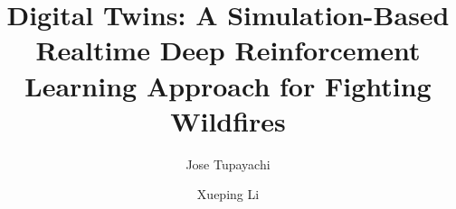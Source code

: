 \documentclass{scspaperproc}
\theoremstyle{scsthe}
\begin{document}
%
%

\def\SCSconferencename{Annual Simulation Conference}

\def\SCSconferenceacro{ANNSIM'24}

\def\SCSpublicationyear{2024}

\def\SCSconferenceeditors{P.J. Giabbanelli, I. David, C. Ruiz-Martin, B. Oakes and R. C\'{a}rdenas}

\def\SCSconferencedates{May 20-23}

\def\SCSconferencevenue{American University, DC, USA}

\title{Digital Twins: A Simulation-Based Realtime Deep Reinforcement Learning Approach for Fighting Wildfires}

\author[\authorrefmark{1} ]{Jose Tupayachi}
\author[\authorrefmark{1}]{Xueping Li}



\end{document}
